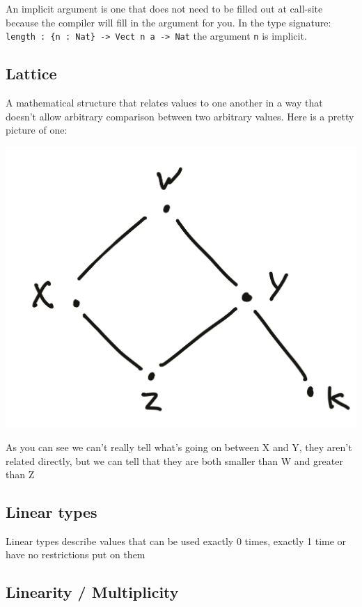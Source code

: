 \documentclass[
]{article}
\begin{document}
An implicit argument is one that does not need to be filled out at
call-site because the compiler will fill in the argument for you. In the
type signature:
\texttt{length\ :\ \{n\ :\ Nat\}\ -\textgreater{}\ Vect\ n\ a\ -\textgreater{}\ Nat}
the argument \texttt{n} is implicit.

\hypertarget{lattice}{%
\subsection{Lattice}\label{lattice}}

A mathematical structure that relates values to one another in a way
that doesn't allow arbitrary comparison between two arbitrary values.
Here is a pretty picture of one:

\includegraphics{lattice.jpg}

As you can see we can't really tell what's going on between X and Y,
they aren't related directly, but we can tell that they are both smaller
than W and greater than Z

\hypertarget{linear-types-1}{%
\subsection{Linear types}\label{linear-types-1}}

Linear types describe values that can be used exactly 0 times, exactly 1
time or have no restrictions put on them

\hypertarget{linearity-multiplicity}{%
\subsection{Linearity / Multiplicity}\label{linearity-multiplicity}}
\end{document}
